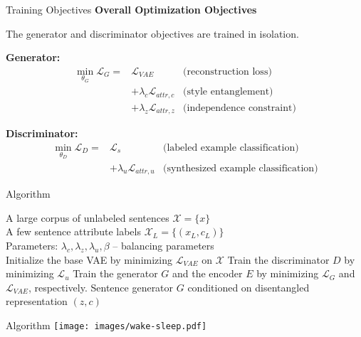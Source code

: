 \documentclass{beamer}
\begin{document}
\begin{frame}{Training Objectives}
  \textbf{Overall Optimization Objectives}

  The generator and discriminator objectives are trained in isolation.

  \textbf{Generator:}
  \begin{eqnarray*}
    \operatorname*{min}_{\theta_G} \mathcal{L}_G =
      & \mathcal{L}_{VAE} & \text{(reconstruction loss)} \\
      & + \lambda_c \mathcal{L}_{attr,c} & \text{(style entanglement)} \\
      & + \lambda_z \mathcal{L}_{attr,z} & \text{(independence constraint)}
  \end{eqnarray*}

  \textbf{Discriminator:}
  \begin{eqnarray*}
    \operatorname*{min}_{\theta_D} \mathcal{L}_D =
      & \mathcal{L}_{s} & \text{(labeled example classification)} \\
      & + \lambda_u \mathcal{L}_{attr,u} & \text{(synthesized example classification)}
  \end{eqnarray*}
\end{frame}

\begin{frame}{Algorithm}
\begin{algorithm}[H]
  \centering
  \begin{algorithmic}[1]
  \REQUIRE A large corpus of unlabeled sentences $\mathcal{X}=\{x\}$ \\
  \quad A few sentence attribute labels $\mathcal{X}_L = \{(x_L,c_L)\}$ \\
  \quad Parameters: $\lambda_c, \lambda_z, \lambda_u, \beta$  -- balancing parameters \\
  \STATE Initialize the base VAE by minimizing $\mathcal{L}_{VAE}$ on $\mathcal{X}$
  \REPEAT
      \STATE Train the discriminator $D$ by minimizing $\mathcal{L}_u$
      \STATE Train the generator $G$ and the encoder $E$ by minimizing $\mathcal{L}_G$ and $\mathcal{L}_{VAE}$, respectively.
  \ENSURE Sentence generator $G$ conditioned on disentangled representation $(z,c)$
  \end{algorithmic}
  \end{algorithm}
\end{frame}

\begin{frame}{Algorithm}
  \centering
  \texttt{[image: images/wake-sleep.pdf]}
\end{frame}
\end{document}
